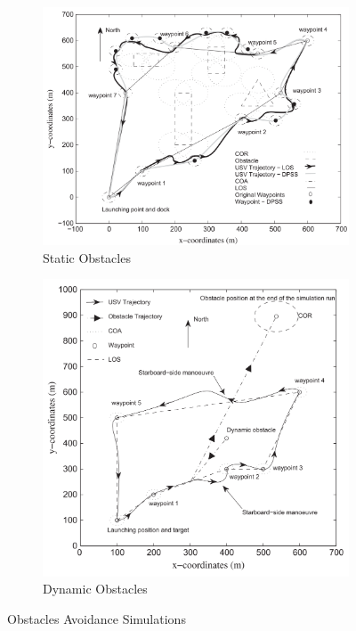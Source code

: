     \begin{figure}[H]
    \centering
    
        \begin{subfigure}[b]{0.5\textwidth}
            \centering
            \includegraphics[width=\textwidth]{figs/Naeem2012COLREGS_Trajectories_StaticObstacles.png}
            \caption{Static Obstacles}
            \label{fig:Naeem2012COLREGS_Trajectories_StaticObstacles}
        \end{subfigure}
        \begin{subfigure}[b]{0.4\textwidth}
            \centering
            \includegraphics[width=\textwidth]{figs/Naeem2012COLREGS_Trajectories_DynamicObstacles.png}
            \caption{Dynamic Obstacles}
            \label{fig:Naeem2012COLREGS_Trajectories_DynamicObstacles}
        \end{subfigure}
    
    \caption{Obstacles Avoidance Simulations \cite{Naeem2012COLREGS}}
    \label{fig:Naeem2012COLREGS_Trajectories}
    \end{figure}
